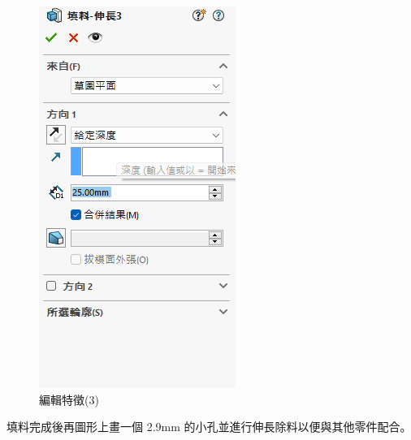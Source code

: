 \begin{figure}[h!]
\begin{minipage}[b]{0.35\textwidth}
        \includegraphics[width=\textwidth,height=0.25\textheight]{./../images/6-1-17} 
        \caption{編輯特徵(3)}
        \label{fig:feature1}
    \end{minipage}
\end{figure}

填料完成後再圖形上畫一個 2.9mm 的小孔並進行伸長除料以便與其他零件配合。

